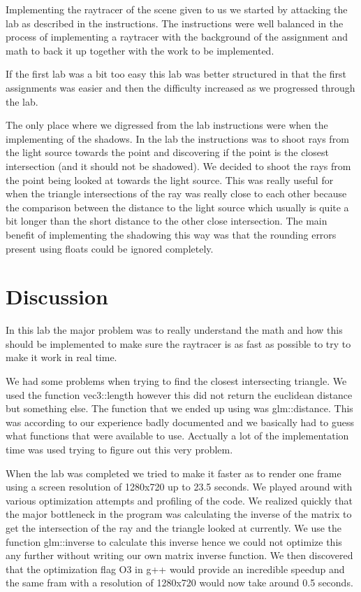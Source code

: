 \documentclass[a4paper]{article}
\begin{document}
Implementing the raytracer of the scene given to us we started by attacking the
lab as described in the instructions. The instructions were well balanced in the
process of implementing a raytracer with the background of the assignment and
math to back it up together with the work to be implemented.

If the first lab was a bit too easy this lab was better structured in that the
first assignments was easier and then the difficulty increased as we progressed
through the lab.

The only place where we digressed from the lab instructions were when the
implementing of the shadows. In the lab the instructions was to shoot rays from
the light source towards the point and discovering if the point is the closest
intersection (and it should not be shadowed). We decided to shoot the rays from
the point being looked at towards the light source. This was really useful for
when the triangle intersections of the ray was really close to each other
because the comparison between the distance to the light source which usually is
quite a bit longer than the short distance to the other close intersection. The
main benefit of implementing the shadowing this way was that the rounding errors
present using floats could be ignored completely.

\section{Discussion}
In this lab the major problem was to really understand the math and how this
should be implemented to make sure the raytracer is as fast as possible to try
to make it work in real time.

We had some problems when trying to find the closest intersecting triangle. We
used the function vec3::length however this did not return the euclidean
distance but something else. The function that we ended up using was
glm::distance. This was according to our experience badly documented and we
basically had to guess what functions that were available to use. Acctually a
lot of the implementation time was used trying to figure out this very problem.

When the lab was completed we tried to make it faster as to render one frame
using a screen resolution of 1280x720 up to 23.5 seconds. We played around with
various optimization attempts and profiling of the code. We realized quickly
that the major bottleneck in the program was calculating the inverse of the
matrix to get the intersection of the ray and the triangle looked at currently.
We use the function glm::inverse to calculate this inverse hence we could not
optimize this any further without writing our own matrix inverse function. We
then discovered that the optimization flag O3 in g++ would provide an incredible
speedup and the same fram with a resolution of 1280x720 would now take around 0.5
seconds.
\end{document}
